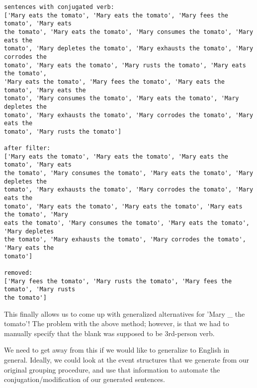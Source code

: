 \documentclass[11pt]{article}
\begin{document}
    \begin{Verbatim}[commandchars=\\\{\},fontsize=\footnotesize]
sentences with conjugated verb:
['Mary eats the tomato', 'Mary eats the tomato', 'Mary fees the tomato', 'Mary eats
the tomato', 'Mary eats the tomato', 'Mary consumes the tomato', 'Mary eats the
tomato', 'Mary depletes the tomato', 'Mary exhausts the tomato', 'Mary corrodes the
tomato', 'Mary eats the tomato', 'Mary rusts the tomato', 'Mary eats the tomato',
'Mary eats the tomato', 'Mary fees the tomato', 'Mary eats the tomato', 'Mary eats the
tomato', 'Mary consumes the tomato', 'Mary eats the tomato', 'Mary depletes the
tomato', 'Mary exhausts the tomato', 'Mary corrodes the tomato', 'Mary eats the
tomato', 'Mary rusts the tomato']

after filter:
['Mary eats the tomato', 'Mary eats the tomato', 'Mary eats the tomato', 'Mary eats
the tomato', 'Mary consumes the tomato', 'Mary eats the tomato', 'Mary depletes the
tomato', 'Mary exhausts the tomato', 'Mary corrodes the tomato', 'Mary eats the
tomato', 'Mary eats the tomato', 'Mary eats the tomato', 'Mary eats the tomato', 'Mary
eats the tomato', 'Mary consumes the tomato', 'Mary eats the tomato', 'Mary depletes
the tomato', 'Mary exhausts the tomato', 'Mary corrodes the tomato', 'Mary eats the
tomato']

removed:
['Mary fees the tomato', 'Mary rusts the tomato', 'Mary fees the tomato', 'Mary rusts
the tomato']

    \end{Verbatim}

    This finally allows us to come up with generalized alternatives for
'Mary \_ the tomato'! The problem with the above method; however, is
that we had to manually specify that the blank was supposed to be
3rd-person verb.

We need to get away from this if we would like to generalize to English
in general. Ideally, we could look at the event structures that we
generate from our original grouping procedure, and use that information
to automate the conjugation/modification of our generated sentences.
\end{document}
